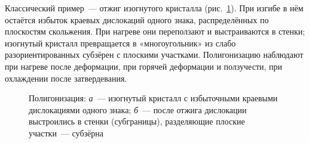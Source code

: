 Классический пример~— отжиг изогнутого кристалла
(рис.~\ref{fig:polygonization}). При изгибе в нём остаётся избыток
краевых дислокаций одного знака, распределённых по плоскостям
скольжения. При нагреве они переползают и выстраиваются в стенки;
изогнутый кристалл превращается в «многоугольник» из слабо
разориентированных субзёрен с плоскими участками. Полигонизацию наблюдают
при нагреве после деформации, при горячей деформации и ползучести, при
охлаждении после затвердевания.

\begin{figure}[ht]
\centering
{}
\caption{Полигонизация: \textit{а}~— изогнутый кристалл с избыточными
краевыми дислокациями одного знака; \textit{б}~— после отжига дислокации
выстроились в стенки (субграницы), разделяющие плоские участки~— субзёрна}
\label{fig:polygonization}
\end{figure}

